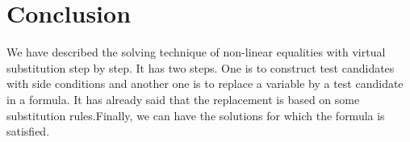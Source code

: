 \section{Conclusion}
\label{sec:conclusion}
We have described the solving technique of non-linear equalities with virtual substitution step by step. It has two steps. One is to construct test candidates with side conditions and another one is to replace a variable by a test candidate in a formula. It has already said that the replacement is based on some substitution rules.Finally, we can have the solutions for which the formula is satisfied.
